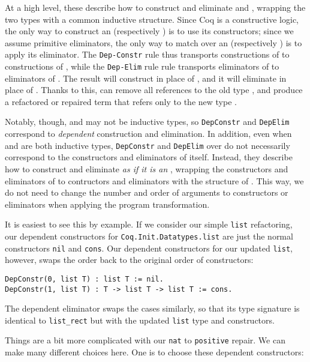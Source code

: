 At a high level, these describe how to construct and eliminate \A and \B, wrapping the two types with a common inductive structure.
Since Coq is a constructive logic, the only way to construct an \A (respectively \B) is to use its
constructors; since we assume primitive eliminators, the only way to match over an \A (respectively \B)
is to apply its eliminator. 
The \lstinline{Dep-Constr} rule thus transports constructions of \A to constructions of \B,
while the \lstinline{Dep-Elim} rule rule transports eliminators of \A to eliminators of \B.
The result will construct \B in place of \A, and it will eliminate \B in place of \A.
Thanks to this, \toolname can remove all references to the old type \A,
and produce a refactored or repaired term that refers only to the new type \B.

Notably, though, \A and \B may not be inductive types, so \lstinline{DepConstr} and \lstinline{DepElim}
correspond to \textit{dependent} construction and elimination.
In addition, even when \A and \B are both inductive types,
\lstinline{DepConstr} and \lstinline{DepElim} over \B do not necessarily correspond
to the constructors and eliminators of \B itself.
Instead, they describe how to construct and eliminate \B \textit{as if it is an \A},
wrapping the constructors and eliminators of \B to contructors and eliminators with the
structure of \A.
This way, we do not need to change the number and order of arguments to constructors or eliminators when applying the program transformation.

It is easiest to see this by example.
If we consider our simple \lstinline{list} refactoring, our dependent
constructors for \lstinline{Coq.Init.Datatypes.list} are just the normal constructors
\lstinline{nil} and \lstinline{cons}. Our dependent constructors for our updated
\lstinline{list}, however, swaps the order back to the original order of constructors:

\begin{lstlisting}
DepConstr(0, list T) : list T := nil.
DepConstr(1, list T) : T -> list T -> list T := cons.
\end{lstlisting}
The dependent eliminator swaps the cases similarly, so that its type signature is identical
to \lstinline{list_rect} but with the updated \lstinline{list} type and constructors.

Things are a bit more complicated with our \lstinline{nat} to \lstinline{positive} repair.
We can make many different choices here. One is to choose these dependent constructors:

